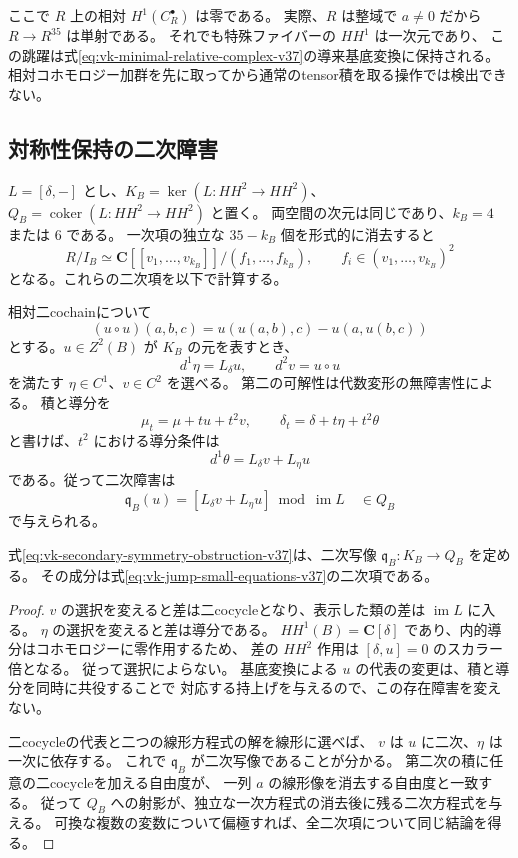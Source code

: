 ここで $R$ 上の相対 $H^1(C_R^\bullet)$ は零である。
実際、$R$ は整域で $a\ne0$ だから $R\to R^{35}$ は単射である。
それでも特殊ファイバーの $HH^1$ は一次元であり、
この跳躍は式\eqref{eq:vk-minimal-relative-complex-v37}の導来基底変換に保持される。
相対コホモロジー加群を先に取ってから通常のtensor積を取る操作では検出できない。

\subsection{対称性保持の二次障害}

$L=[\delta,-]$ とし、$K_B=\ker(L:HH^2\to HH^2)$、
$Q_B=\operatorname{coker}(L:HH^2\to HH^2)$ と置く。
両空間の次元は同じであり、$k_B=4$ または $6$ である。
一次項の独立な $35-k_B$ 個を形式的に消去すると
\begin{equation}
 R/I_B\simeq
 \mathbf C[[v_1,\ldots,v_{k_B}]]/(f_1,\ldots,f_{k_B}),
 \qquad f_i\in(v_1,\ldots,v_{k_B})^2
 \label{eq:vk-jump-small-equations-v37}
\end{equation}
となる。これらの二次項を以下で計算する。

相対二cochainについて
\[
 (u\circ u)(a,b,c)=u(u(a,b),c)-u(a,u(b,c))
\]
とする。$u\in Z^2(B)$ が $K_B$ の元を表すとき、
\[
 d^1\eta=L_\delta u,\qquad d^2v=u\circ u
\]
を満たす $\eta\in C^1$、$v\in C^2$ を選べる。
第二の可解性は代数変形の無障害性による。
積と導分を
\[
 \mu_t=\mu+tu+t^2v,\qquad
 \delta_t=\delta+t\eta+t^2\theta
\]
と書けば、$t^2$ における導分条件は
\[
 d^1\theta=L_\delta v+L_\eta u
\]
である。従って二次障害は
\begin{equation}
 \mathfrak q_B(u)=
 [L_\delta v+L_\eta u]\bmod\operatorname{im}L
 \quad\in Q_B
 \label{eq:vk-secondary-symmetry-obstruction-v37}
\end{equation}
で与えられる。

\begin{lemma}[二次障害の独立性]
\label{lem:vk-quadratic-obstruction-v37}
式\eqref{eq:vk-secondary-symmetry-obstruction-v37}は、二次写像
$\mathfrak q_B:K_B\to Q_B$ を定める。
その成分は式\eqref{eq:vk-jump-small-equations-v37}の二次項である。
\end{lemma}

\begin{proof}
$v$ の選択を変えると差は二cocycleとなり、表示した類の差は
$\operatorname{im}L$ に入る。
$\eta$ の選択を変えると差は導分である。
$HH^1(B)=\mathbf C[\delta]$ であり、内的導分はコホモロジーに零作用するため、
差の $HH^2$ 作用は $[\delta,u]=0$ のスカラー倍となる。
従って選択によらない。
基底変換による $u$ の代表の変更は、積と導分を同時に共役することで
対応する持上げを与えるので、この存在障害を変えない。

二cocycleの代表と二つの線形方程式の解を線形に選べば、
$v$ は $u$ に二次、$\eta$ は一次に依存する。
これで $\mathfrak q_B$ が二次写像であることが分かる。
第二次の積に任意の二cocycleを加える自由度が、
一列 $a$ の線形像を消去する自由度と一致する。
従って $Q_B$ への射影が、独立な一次方程式の消去後に残る二次方程式を与える。
可換な複数の変数について偏極すれば、全二次項について同じ結論を得る。
\end{proof}

